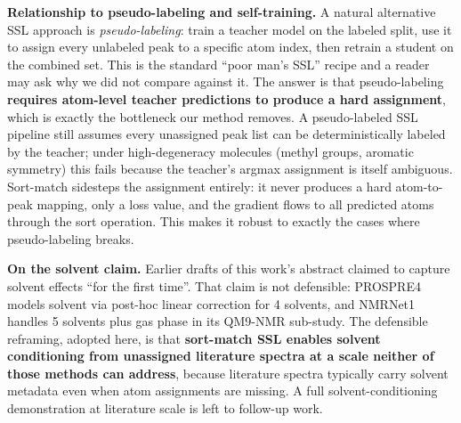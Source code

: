 \documentclass[
]{article}
\begin{document}
\textbf{Relationship to pseudo-labeling and self-training.} A natural
alternative SSL approach is \emph{pseudo-labeling}: train a teacher
model on the labeled split, use it to assign every unlabeled peak to a
specific atom index, then retrain a student on the combined set. This is
the standard ``poor man's SSL'' recipe and a reader may ask why we did
not compare against it. The answer is that pseudo-labeling
\textbf{requires atom-level teacher predictions to produce a hard
assignment}, which is exactly the bottleneck our method removes. A
pseudo-labeled SSL pipeline still assumes every unassigned peak list can
be deterministically labeled by the teacher; under high-degeneracy
molecules (methyl groups, aromatic symmetry) this fails because the
teacher's argmax assignment is itself ambiguous. Sort-match sidesteps
the assignment entirely: it never produces a hard atom-to-peak mapping,
only a loss value, and the gradient flows to all predicted atoms through
the sort operation. This makes it robust to exactly the cases where
pseudo-labeling breaks.

\textbf{On the solvent claim.} Earlier drafts of this work's abstract
claimed to capture solvent effects ``for the first time''. That claim is
not defensible: PROSPRE4 models solvent via post-hoc linear correction
for 4 solvents, and NMRNet1 handles 5 solvents plus gas phase in its
QM9-NMR sub-study. The defensible reframing, adopted here, is that
\textbf{sort-match SSL enables solvent conditioning from unassigned
literature spectra at a scale neither of those methods can address},
because literature spectra typically carry solvent metadata even when
atom assignments are missing. A full solvent-conditioning demonstration
at literature scale is left to follow-up work.
\end{document}
